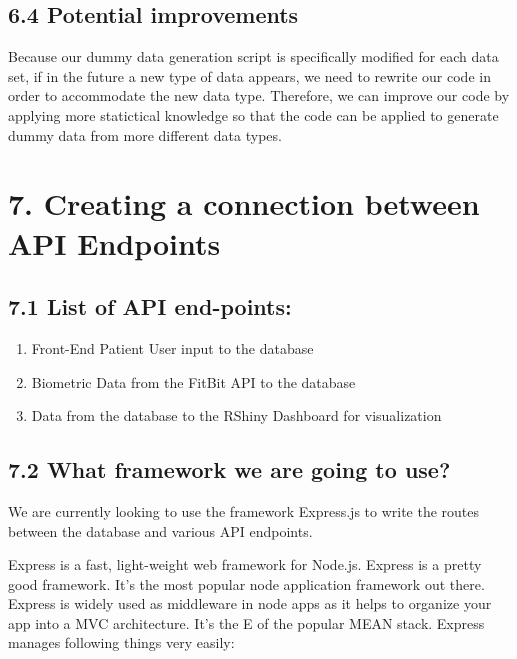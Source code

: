 \documentclass[]{book}
\providecommand{\tightlist}{%
  \setlength{\itemsep}{0pt}\setlength{\parskip}{0pt}}
\begin{document}
\subsection{6.4 Potential improvements}\label{potential-improvements-1}

Because our dummy data generation script is specifically modified for
each data set, if in the future a new type of data appears, we need to
rewrite our code in order to accommodate the new data type. Therefore,
we can improve our code by applying more statictical knowledge so that
the code can be applied to generate dummy data from more different data
types.

\section{7. Creating a connection between API
Endpoints}\label{creating-a-connection-between-api-endpoints-1}

\subsection{7.1 List of API end-points:}\label{list-of-api-end-points-1}

\begin{enumerate}
\def\labelenumi{\arabic{enumi}.}
\tightlist
\item
  Front-End Patient User input to the database
\item
  Biometric Data from the FitBit API to the database
\item
  Data from the database to the RShiny Dashboard for visualization
\end{enumerate}

\subsection{7.2 What framework we are going to
use?}\label{what-framework-we-are-going-to-use-1}

We are currently looking to use the framework Express.js to write the
routes between the database and various API endpoints.

Express is a fast, light-weight web framework for Node.js. Express is a
pretty good framework. It's the most popular node application framework
out there. Express is widely used as middleware in node apps as it helps
to organize your app into a MVC architecture. It's the E of the popular
MEAN stack. Express manages following things very easily:
\end{document}
